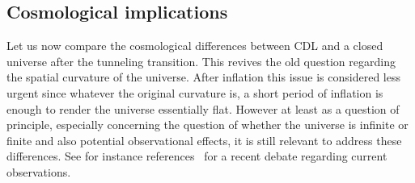 \documentclass[a4paper,11pt]{article}
\numberwithin{equation}{section}
\begin{document}
\label{sec:LorentzianGeometry}


\subsection{Cosmological implications}

Let us now compare the cosmological differences between CDL and a closed universe after the tunneling transition. This revives the old question regarding the spatial curvature of the universe. After inflation this issue is considered less urgent since whatever the original curvature is, a short period of inflation is enough to render the universe essentially flat. However at least as a question of principle, especially concerning  the question of whether the universe is infinite or finite  and also potential observational effects, it is still relevant to address these differences. See for instance references~\cite{Efstathiou:2003hk,Aghanim:2018eyx,DiValentino:2019qzk,Handley:2019tkm, Efstathiou:2020wem, DiValentino:2020hov} for a recent debate regarding current observations.
\end{document}
